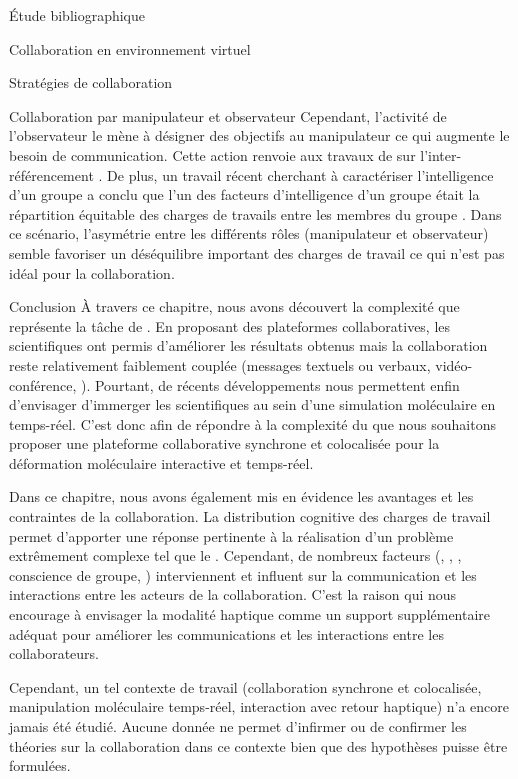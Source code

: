 \documentclass[myfrancais,ngerman,english,french]{mythesis}
\begin{document}
\begin{mychapter}{Étude bibliographique}
\begin{mysection}{Collaboration en environnement virtuel}
\begin{mysubsection}{Stratégies de collaboration}
\begin{mysubsubsection}{Collaboration par manipulateur et observateur}
					Cependant, l'activité de l'observateur le mène à désigner des objectifs au manipulateur ce qui augmente le besoin de communication.
					Cette action renvoie aux travaux de  sur l'inter-référencement .
					De plus, un travail récent cherchant à caractériser \og l'intelligence d'un groupe \fg a conclu que l'un des facteurs d'intelligence d'un groupe était la répartition équitable des charges de travails entre les membres du groupe .
					Dans ce scénario, l'asymétrie entre les différents rôles (manipulateur et observateur) semble favoriser un déséquilibre important des charges de travail ce qui n'est pas idéal pour la collaboration.
				\end{mysubsubsection}
			\end{mysubsection}
		\end{mysection}
		\begin{mysection}{Conclusion}
			À travers ce chapitre, nous avons découvert la complexité que représente la tâche de .
			En proposant des plateformes collaboratives, les scientifiques ont permis d'améliorer les résultats obtenus mais la collaboration reste relativement faiblement couplée (messages textuels ou verbaux, vidéo-conférence, \myetc).
			Pourtant, de récents développements nous permettent enfin d'envisager d'immerger les scientifiques au sein d'une simulation moléculaire en temps-réel.
			C'est donc afin de répondre à la complexité du  que nous souhaitons proposer une plateforme collaborative synchrone et colocalisée pour la déformation moléculaire interactive et temps-réel.

			Dans ce chapitre, nous avons également mis en évidence les avantages et les contraintes de la collaboration.
			La distribution cognitive des charges de travail permet d'apporter une réponse pertinente à la réalisation d'un problème extrêmement complexe tel que le .
			Cependant, de nombreux facteurs (, , \mygrounding, conscience de groupe, \myetc) interviennent et influent sur la communication et les interactions entre les acteurs de la collaboration.
			C'est la raison qui nous encourage à envisager la modalité haptique comme un support supplémentaire adéquat pour améliorer les communications et les interactions entre les collaborateurs.

			Cependant, un tel contexte de travail (collaboration synchrone et colocalisée, manipulation moléculaire temps-réel, interaction avec retour haptique) n'a encore jamais été étudié.
			Aucune donnée ne permet d'infirmer ou de confirmer les théories sur la collaboration dans ce contexte bien que des hypothèses puisse être formulées.


\end{mysection}
\end{mychapter}
\end{document}

